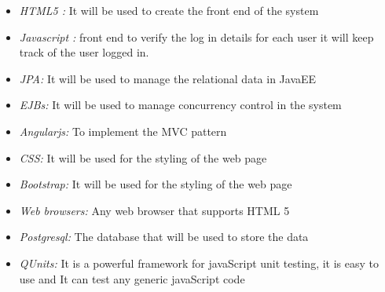 \documentclass[a4paper,12pt]{article}
\begin{document}
\begin{itemize}
	\item \textit{HTML5 : }It will be used to create the front end of the system
\end{itemize}
\begin{itemize}
	\item \textit{Javascript :} front end to verify the log in details for each user it will keep track of the user logged in.
\end{itemize}
\begin{itemize}
	\item \textit{JPA:} It will be used to manage the relational data in JavaEE
\end{itemize}
\begin{itemize}
	\item \textit{EJBs:} It will be used to manage concurrency control in the system
\end{itemize}
\begin{itemize}
	\item \textit{Angularjs:} To implement the MVC pattern
\end{itemize}
\begin{itemize}
	\item \textit{CSS:} It will be used for the styling of the web page
\end{itemize}
\begin{itemize}
	\item \textit{Bootstrap:} It will be used for the styling of the web page 
\end{itemize}
\begin{itemize}
	\item \textit{Web browsers:} Any web browser that supports HTML 5
\end{itemize}
\begin{itemize}
	\item \textit{Postgresql:} The database that will be used to store the data
\end{itemize}

\begin{itemize}
	\item \textit{QUnits:} It is a powerful framework for javaScript unit testing, it is easy to use and It can test any generic javaScript code
\end{itemize}
\end{document}

